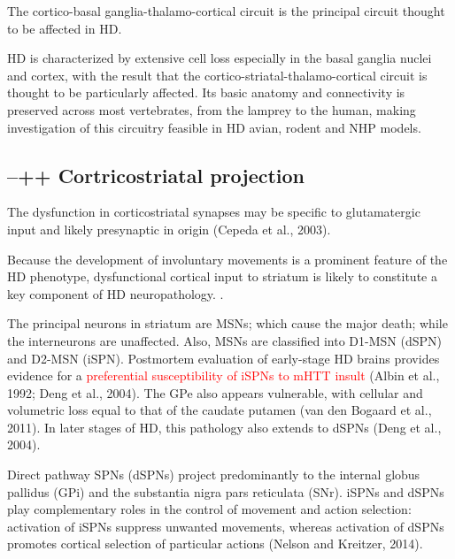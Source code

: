 The cortico-basal ganglia-thalamo-cortical circuit is the principal circuit
thought to be affected in HD.

HD is characterized by extensive cell loss especially in the basal ganglia
nuclei and cortex, with the result that the cortico-striatal-thalamo-cortical
circuit is thought to be particularly affected. Its basic anatomy and
connectivity is preserved across most vertebrates, from the lamprey to the
human, making investigation of this circuitry feasible in HD avian, rodent and
NHP models.




\subsection{--++ Cortricostriatal projection}
\label{sec:HD-theory-cortical-input}


The dysfunction in corticostriatal synapses may be specific to glutamatergic
input and likely presynaptic in origin (Cepeda et al., 2003).


Because the development of involuntary movements is a prominent feature of the
HD phenotype, dysfunctional cortical input to striatum is likely to constitute a
key component of HD neuropathology. \citep{estradasancher2013}.

The principal neurons in striatum are MSNs; which cause the major death; while
the interneurons are unaffected. Also, MSNs are classified into D1-MSN (dSPN)
and D2-MSN (iSPN). Postmortem evaluation of early-stage HD brains provides
evidence for a \textcolor{red}{preferential susceptibility of iSPNs to mHTT
insult} (Albin et al., 1992; Deng et al., 2004). The GPe also appears
vulnerable, with cellular and volumetric loss equal to that of the caudate
putamen (van den Bogaard et al., 2011). In later stages of HD, this pathology
also extends to dSPNs (Deng et al., 2004).


Direct pathway SPNs (dSPNs) project predominantly to the internal globus
pallidus (GPi) and the substantia nigra pars reticulata (SNr). iSPNs and dSPNs
play complementary roles in the control of movement and action selection:
activation of iSPNs suppress unwanted movements, whereas activation of dSPNs
promotes cortical selection of particular actions (Nelson and Kreitzer, 2014).


